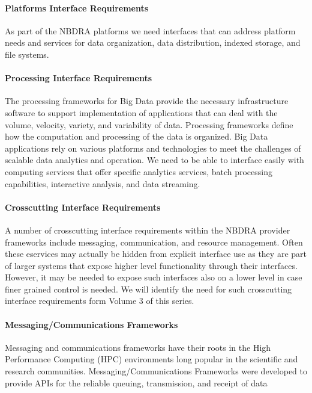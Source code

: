 \documentclass[10pt]{article}
\begin{document}
\paragraph{Platforms Interface Requirements}

As part of the NBDRA platforms we need interfaces that can address
platform needs and services for data organization, data distribution,
indexed storage, and file systems.

\paragraph{Processing Interface Requirements}

The processing frameworks for Big Data provide the necessary
infrastructure software to support implementation of applications that
can deal with the volume, velocity, variety, and variability of data.
Processing frameworks define how the computation and processing of the
data is organized. Big Data applications rely on various platforms and
technologies to meet the challenges of scalable data analytics and
operation. We need to be able to interface easily with computing
services that offer specific analytics services, batch processing
capabilities, interactive analysis, and data streaming.

\paragraph{Crosscutting Interface Requirements}

A number of crosscutting interface requirements within the NBDRA
provider frameworks include messaging, communication, and resource
management. Often these eservices may actually be hidden from explicit
interface use as they are part of larger systems that expose higher
level functionality through their interfaces. However, it may be
needed to expose such interfaces also on a lower level in case finer
grained control is needed. We will identify the need for such
crosscutting interface requirements form Volume 3 of this series.

\paragraph{Messaging/Communications Frameworks}

Messaging and communications frameworks have their roots in the High
Performance Computing (HPC) environments long popular in the
scientific and research communities. Messaging/Communications
Frameworks were developed to provide APIs for the reliable queuing,
transmission, and receipt of data
\end{document}
